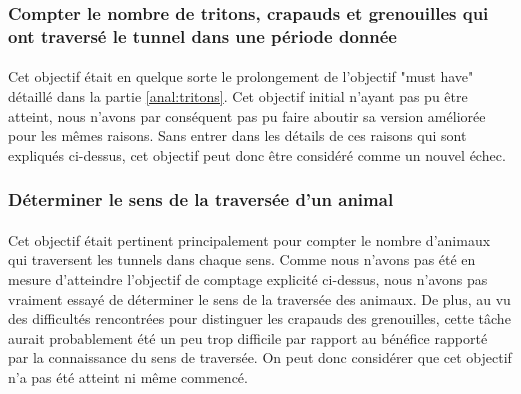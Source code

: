 \subsubsection{Compter le nombre de tritons, crapauds et grenouilles qui ont traversé le tunnel dans une période donnée}
\paragraph{} Cet objectif était en quelque sorte le prolongement de l'objectif "must have" détaillé dans la partie \ref{anal:tritons}. Cet objectif initial n'ayant pas pu être atteint, nous n'avons par conséquent pas pu faire aboutir sa version améliorée pour les mêmes raisons. Sans entrer dans les détails de ces raisons qui sont expliqués ci-dessus, cet objectif peut donc être considéré comme un nouvel échec.

\subsubsection{Déterminer le sens de la traversée d’un animal}
\paragraph{} Cet objectif était pertinent principalement pour compter le nombre d'animaux qui traversent les tunnels dans chaque sens. Comme nous n'avons pas été en mesure d'atteindre l'objectif de comptage explicité ci-dessus, nous n'avons pas vraiment essayé de déterminer le sens de la traversée des animaux. De plus, au vu des difficultés rencontrées pour distinguer les crapauds des grenouilles, cette tâche aurait probablement été un peu trop difficile par rapport au bénéfice rapporté par la connaissance du sens de traversée. On peut donc considérer que cet objectif n'a pas été atteint ni même commencé.
